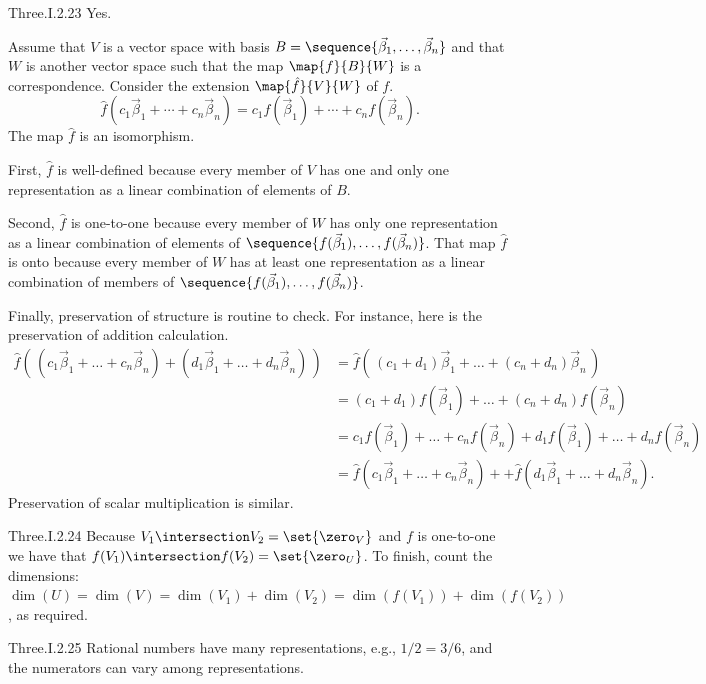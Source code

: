 \begin{ans}{Three.I.2.23}
      Yes.

      Assume that \( V \) is a vector space with basis
      \( B=\sequence{\vec{\beta}_1,\ldots,\vec{\beta}_n} \) and that \( W \)
      is another vector space such that the map \( \map{f}{B}{W} \) is
      a correspondence.
      Consider the extension \( \map{\hat{f}}{V}{W} \) of \( f \).
      \begin{equation*}
        \hat{f}(c_1\vec{\beta}_1+\cdots+c_n\vec{\beta}_n)=
        c_1f(\vec{\beta}_1)+\cdots+c_nf(\vec{\beta}_n).
      \end{equation*}
      The map \( \hat{f} \) is an isomorphism.

      First, \( \hat{f} \) is well-defined because every member of \( V \)
      has one and only one representation as a linear combination of elements
      of \( B \).

      Second, \( \hat{f} \) is one-to-one because every member of \( W \) has
      only one representation as a linear combination of elements of
      \( \sequence{f(\vec{\beta}_1),\dots,f(\vec{\beta}_n)} \).
      That map \( \hat{f} \) is onto because every member of \( W \) has at
      least one representation as a linear combination of members of
      \( \sequence{f(\vec{\beta}_1),\dots,f(\vec{\beta}_n)} \).

      Finally, preservation of structure is routine to check.
      For instance, here is the preservation of addition calculation.
      \begin{align*}
        \hat{f}(\,(c_1\vec{\beta}_1+\dots+c_n\vec{\beta}_n)+
                  (d_1\vec{\beta}_1+\dots+d_n\vec{\beta}_n)\,)
        &=\hat{f}(\,(c_1+d_1)\vec{\beta}_1+\dots+(c_n+d_n)\vec{\beta}_n\,) \\
        &=(c_1+d_1)f(\vec{\beta}_1)+\dots+(c_n+d_n)f(\vec{\beta}_n) \\
        &=c_1f(\vec{\beta}_1)+\dots+c_nf(\vec{\beta}_n)
          +d_1f(\vec{\beta}_1)+\dots+d_nf(\vec{\beta}_n) \\
        &=\hat{f}(c_1\vec{\beta}_1+\dots+c_n\vec{\beta}_n)+
          +\hat{f}(d_1\vec{\beta}_1+\dots+d_n\vec{\beta}_n).
      \end{align*}
      Preservation of scalar multiplication is similar.
    
\end{ans}
\begin{ans}{Three.I.2.24}
      Because \( V_1\intersection V_2=\set{\zero_V} \) and \( f \) is
      one-to-one we have that \( f(V_1)\intersection f(V_2)=\set{\zero_U} \).
      To finish, count the dimensions:
      \( \dim(U)=\dim(V)=\dim(V_1)+\dim(V_2)=\dim(f(V_1))+\dim(f(V_2)) \),
      as required.
    
\end{ans}
\begin{ans}{Three.I.2.25}
      Rational numbers have many representations, e.g.,
      \( 1/2=3/6 \), and the numerators can vary among
      representations.
    
\end{ans}
